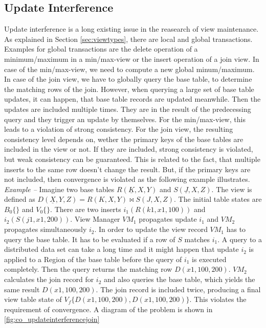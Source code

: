 \documentclass[11pt,a4paper,bibtotoc,idxtotoc,headsepline,footsepline,footexclude,BCOR12mm,DIV13]{scrbook}
\begin{document}
\subsection{Update Interference} 
Update interference is a long existing issue in the reasearch of view maintenance. As explained in Section \ref{sec:viewtypes}, there are local and global transactions. Examples for global transactions are the delete operation of a minimum/maximum in a min/max-view or the insert operation of a join view. In case of the min/max-view, we need to compute a new global minum/maximum. In case of the join view, we have to globally query the base table, to determine the matching rows of the join. However, when querying a large set of base table updates, it can happen, that base table records are updated meanwhile. Then the updates are included multiple times. They are in the result of the predecessing query and they trigger an update by themselves. For the min/max-view, this leads to a violation of strong consistency. For the join view, the resulting consistency level depends on, wether the primary keys of the base tables are included in the view or not. If they are included, strong consistency is violated, but weak consistency can be guaranteed. This is related to the fact, that multiple inserts to the same row doesn't change the result. But, if the primary keys are not included, then convergence is violated as the following example illustrates.\\

\noindent  
\emph{Example -- }Imagine two base tables $R(\underline{K},X,Y)$ and  $S(\underline{J},X,Z)$. The view is defined as $D(\underline{X},Y,Z)=R(K,X,Y) \bowtie S(J,X,Z)$. The initial table states are $B_0\{\}$ and $V_0\{\}$. There are two inserts $i_1(R(k1,x1,100))$ and $i_2(S(j1,x1,200))$. View Manager $VM_1$ propagates update $i_1$ and $VM_2$ propagates simultaneously $i_2$. In order to update the view record $VM_1$ has to query the base table. It has to be evaluated if a row of $S$ matches $i_1$. A query to a distributed data set can take a long time and it might happen that update $i_2$ is applied to a Region of the base table before the query of $i_1$ is executed completely. Then the query returns the matching row $D(x1, 100, 200)$. $VM_2$ calculates the join record for $i_2$ and also queries the base table, which yields the same result $D(x1, 100, 200)$. The join record is included twice, producing a final view table state of $V_f\{D(x1, 100, 200), D(x1, 100, 200)\}$.  This violates the requirement of convergence. A diagram of the problem is shown in \ref{fig:co_updateinterferencejoin}\\
\end{document}
